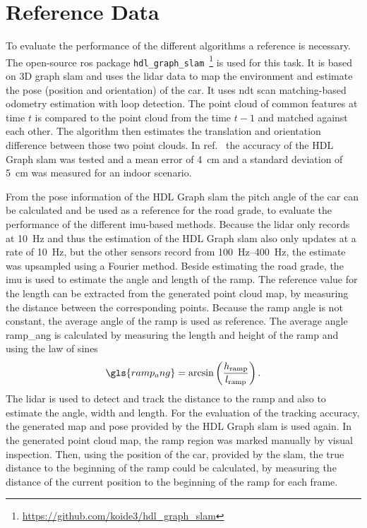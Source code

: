 \section{Reference Data}
To evaluate the performance of the different algorithms a reference is necessary.
The open-source \gls{ros} package \texttt{hdl\_graph\_slam}~\footnote{\url{https://github.com/koide3/hdl_graph_slam}} \cite{Koide2019} is used for this task.
It is based on 3D graph \gls{slam} and uses the \gls{lidar} data to map the environment and estimate the pose (position and orientation) of the car.
It uses \gls{ndt} scan matching-based odometry estimation with loop detection.
The point cloud of common features at time $t$ is compared to the point cloud from the time $t-1$ and matched against each other.
The algorithm then estimates the translation and orientation difference between those two point clouds.
In ref.~\cite{Akpnar2021} the accuracy of the HDL Graph \gls{slam} was tested and a mean error of \SI{4}{\cm} and a standard deviation of \SI{5}{\cm} was measured for an indoor scenario.\par
From the pose information of the HDL Graph \gls{slam} the pitch angle of the car can be calculated and be used as a reference for the road grade, to evaluate the performance of the different \gls{imu}-based methods.
Because the \gls{lidar} only records at \SI{10}{\hertz} and thus the estimation of the HDL Graph \gls{slam} also only updates at a rate of \SI{10}{\hertz}, but the other sensors record from \SIrange{100}{400}{\hertz}, the estimate was upsampled using a Fourier method.
Beside estimating the road grade, the \gls{imu} is used to estimate the angle and length of the ramp.
The reference value for the length can be extracted from the generated point cloud map, by measuring the distance between the corresponding points.
Because the ramp angle is not constant, the average angle of the ramp is used as reference.
The average angle \gls{ramp_ang} is calculated by measuring the length and height of the ramp and using the law of sines
\begin{equation}
	\gls{ramp_ang} = \arcsin\left(\frac{h_\mathrm{ramp}}{l_\mathrm{ramp}}\right).
\end{equation}
The \gls{lidar} is used to detect and track the distance to the ramp and also to estimate the angle, width and length.
For the evaluation of the tracking accuracy, the generated map and pose provided by the HDL Graph \gls{slam} is used again.
In the generated point cloud map, the ramp region was marked manually by visual inspection.
Then, using the position of the car, provided by the \gls{slam}, the true distance to the beginning of the ramp could be calculated, by measuring the distance of the current position to the beginning of the ramp for each frame.\par
